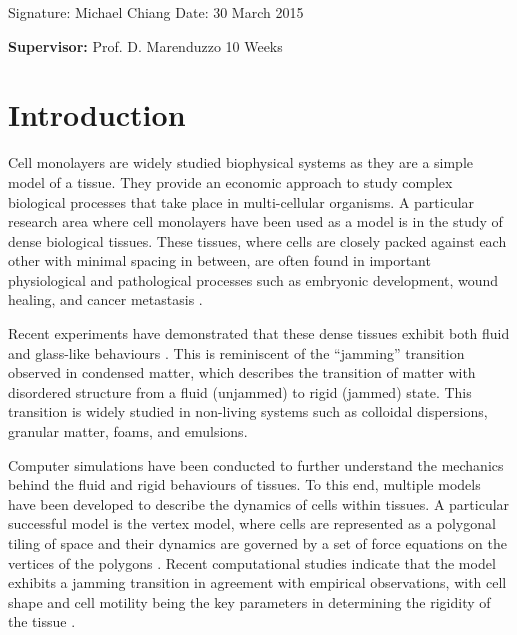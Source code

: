 \documentclass[a4paper,12pt]{article}
\begin{document}
\vspace*{2cm}
Signature: Michael Chiang \hspace*{6.5cm}Date: 30 March 2015

\vfill
{\bf Supervisor:} Prof. D. Marenduzzo                 %
\hfill
10 Weeks                                         %
\newpage
%
\pagestyle{plain}                               %
\setcounter{page}{1}                            %
\tableofcontents                                %

\break
\section{Introduction}
Cell monolayers are widely studied biophysical systems as they are a simple model of a tissue. They provide an economic approach to study complex biological processes that take place in multi-cellular organisms. A particular research area where cell monolayers have been used as a model is in the study of dense biological tissues. These tissues, where cells are closely packed against each other with minimal spacing in between, are often found in important physiological and pathological processes such as embryonic development, wound healing, and cancer metastasis \cite{friedl2009}.  

Recent experiments have demonstrated that these dense tissues exhibit both fluid and glass-like behaviours \cite{angelini2010, schoetz2013}. This is reminiscent of the ``jamming'' transition observed in condensed matter, which describes the transition of matter with disordered structure from a fluid (unjammed) to rigid (jammed) state. This transition is widely studied in non-living systems such as colloidal dispersions, granular matter, foams, and emulsions. 

Computer simulations have been conducted to further understand the mechanics behind the fluid and rigid behaviours of tissues. To this end, multiple models have been developed to describe the dynamics of cells within tissues. A particular successful model is the vertex model, where cells are represented as a polygonal tiling of space and their dynamics are governed by a set of force equations on the vertices of the polygons \cite{nagai2001}. Recent computational studies indicate that the model exhibits a jamming transition in agreement with empirical observations, with cell shape and cell motility being the key parameters in determining the rigidity of the tissue \cite{bi2015density, bi2015motility}.
\end{document}
